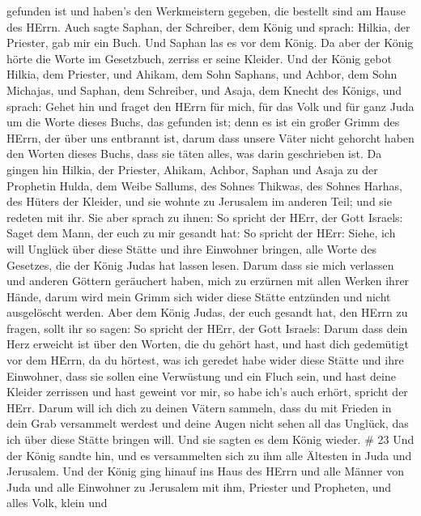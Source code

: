 gefunden ist und haben's den Werkmeistern gegeben, die bestellt sind am
Hause des HErrn.  Auch sagte Saphan, der Schreiber, dem
König und sprach: Hilkia, der Priester, gab mir ein Buch. Und Saphan las
es vor dem König.  Da aber der König hörte die Worte im
Gesetzbuch, zerriss er seine Kleider.  Und der König gebot
Hilkia, dem Priester, und Ahikam, dem Sohn Saphans, und Achbor, dem Sohn
Michajas, und Saphan, dem Schreiber, und Asaja, dem Knecht des Königs,
und sprach:  Gehet hin und fraget den HErrn für mich, für
das Volk und für ganz Juda um die Worte dieses Buchs, das gefunden ist;
denn es ist ein großer Grimm des HErrn, der über uns entbrannt ist,
darum dass unsere Väter nicht gehorcht haben den Worten dieses Buchs,
dass sie täten alles, was darin geschrieben ist.  Da gingen
hin Hilkia, der Priester, Ahikam, Achbor, Saphan und Asaja zu der
Prophetin Hulda, dem Weibe Sallums, des Sohnes Thikwas, des Sohnes
Harhas, des Hüters der Kleider, und sie wohnte zu Jerusalem im anderen
Teil; und sie redeten mit ihr.  Sie aber sprach zu ihnen:
So spricht der HErr, der Gott Israels: Saget dem Mann, der euch zu mir
gesandt hat:  So spricht der HErr: Siehe, ich will Unglück
über diese Stätte und ihre Einwohner bringen, alle Worte des Gesetzes,
die der König Judas hat lassen lesen.  Darum dass sie mich
verlassen und anderen Göttern geräuchert haben, mich zu erzürnen mit
allen Werken ihrer Hände, darum wird mein Grimm sich wider diese Stätte
entzünden und nicht ausgelöscht werden.  Aber dem König
Judas, der euch gesandt hat, den HErrn zu fragen, sollt ihr so sagen: So
spricht der HErr, der Gott Israels:  Darum dass dein Herz
erweicht ist über den Worten, die du gehört hast, und hast dich
gedemütigt vor dem HErrn, da du hörtest, was ich geredet habe wider
diese Stätte und ihre Einwohner, dass sie sollen eine Verwüstung und ein
Fluch sein, und hast deine Kleider zerrissen und hast geweint vor mir,
so habe ich's auch erhört, spricht der HErr.  Darum will
ich dich zu deinen Vätern sammeln, dass du mit Frieden in dein Grab
versammelt werdest und deine Augen nicht sehen all das Unglück, das ich
über diese Stätte bringen will. Und sie sagten es dem König wieder. \#
23  Und der König sandte hin, und es versammelten sich zu
ihm alle Ältesten in Juda und Jerusalem.  Und der König ging
hinauf ins Haus des HErrn und alle Männer von Juda und alle Einwohner zu
Jerusalem mit ihm, Priester und Propheten, und alles Volk, klein und
